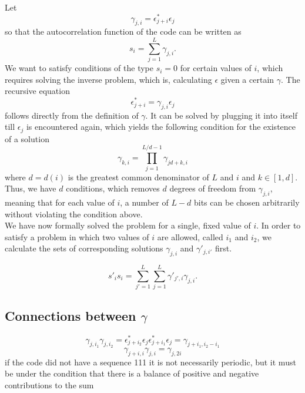 \documentclass[18pt,a4paper]{extarticle}
\begin{document}
Let
\begin{equation}
\gamma_{j, i} = \epsilon_{j + i}^*\epsilon_{j}
\end{equation}
so that the autocorrelation function of the code can be written as
\begin{equation}
s_i = \sum_{j=1}^{L}\gamma_{j, i}.
\end{equation}
We want to satisfy conditions of the type $s_i=0$ for certain values of $i$, which requires solving the inverse problem, which is, calculating $\epsilon$ given a certain $\gamma$.
The recursive equation
\begin{equation}
\epsilon_{j + i}^* = \gamma_{j, i} \epsilon_{j}
\end{equation}
follows directly from the definition of $\gamma$.
It can be solved by plugging it into itself till $\epsilon_j$ is encountered again, which yields the following condition for the existence of a solution
\begin{equation}
\gamma_{k, i} = \prod_{j=1}^{L/d - 1}\gamma_{jd + k, i}
\end{equation}
where $d=d(i)$ is the greatest common denominator of $L$ and $i$ and $k \in [1, d]$.
Thus, we have $d$ conditions, which removes $d$ degrees of freedom from $\gamma_{j, i}$, meaning that for each value of $i$, a number of $L-d$ bits can be chosen arbitrarily without violating the condition above.\\
We have now formally solved the problem for a single, fixed value of $i$.
In order to satisfy a problem in which two values of $i$ are allowed, called $i_1$ and $i_2$, we calculate the sets of corresponding solutions $\gamma_{j, i}$ and $\gamma'_{j, i'}$ first.

\begin{equation}
s'_i s_i = \sum_{j'=1}^{L}\sum_{j=1}^{L}\gamma'_{j', i}\gamma_{j, i}.
\end{equation}

\subsection{Connections between $\gamma$}
\begin{equation}
\gamma_{j, i_1}\gamma_{j, i_2} = \epsilon_{j + i_2}^*\epsilon_{j}\epsilon_{j + i_1}^*\epsilon_{j} = \gamma_{j+i_1, i_2-i_1}
\end{equation}
\begin{equation}
\gamma_{j+i, i}\gamma_{j, i}=\gamma_{j, 2i}
\end{equation}
\newpage
if the code did not have a sequence 111 it is not necessarily periodic, but it must be under the condition that there is a balance of positive and negative contributions to the sum
\end{document}
